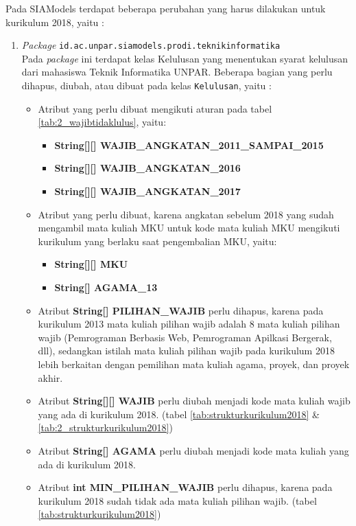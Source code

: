 Pada SIAModels terdapat beberapa perubahan yang harus dilakukan untuk kurikulum 2018, yaitu :
\begin{enumerate}
	\item \textit{Package} \texttt{id.ac.unpar.siamodels.prodi.teknikinformatika}\\
	Pada \textit{package} ini terdapat kelas Kelulusan yang menentukan syarat kelulusan dari mahasiswa Teknik Informatika UNPAR. Beberapa bagian yang perlu dihapus, diubah, atau dibuat pada kelas \texttt{Kelulusan}, yaitu :
	\begin{itemize}
		\item Atribut yang perlu dibuat mengikuti aturan pada tabel \ref{tab:2_wajibtidaklulus}, yaitu:
		\begin{itemize}
			\item \textbf{String[][] WAJIB\_ANGKATAN\_2011\_SAMPAI\_2015}
			\item \textbf{String[][] WAJIB\_ANGKATAN\_2016}
			\item \textbf{String[][] WAJIB\_ANGKATAN\_2017}
		\end{itemize}
		\item Atribut yang perlu dibuat, karena angkatan sebelum 2018 yang sudah mengambil mata kuliah MKU untuk kode mata kuliah MKU mengikuti kurikulum yang berlaku saat pengembalian MKU, yaitu:
		\begin{itemize}
			\item \textbf{String[][] MKU}
			\item \textbf{String[] AGAMA\_13}
		\end{itemize}
		\item Atribut \textbf{String[] PILIHAN\_WAJIB} perlu dihapus, karena pada kurikulum 2013 mata kuliah pilihan wajib adalah 8 mata kuliah pilihan wajib (Pemrograman Berbasis Web, Pemrograman Apilkasi Bergerak, dll), sedangkan istilah mata kuliah pilihan wajib pada kurikulum 2018 lebih berkaitan dengan pemilihan mata kuliah agama, proyek, dan proyek akhir.
		\item Atribut \textbf{String[][] WAJIB} perlu diubah menjadi kode mata kuliah wajib yang ada di kurikulum 2018. (tabel \ref{tab:strukturkurikulum2018} \& \ref{tab:2_strukturkurikulum2018})
		\item Atribut \textbf{String[] AGAMA} perlu diubah menjadi kode mata kuliah yang ada di kurikulum 2018.
		\item Atribut \textbf{int MIN\_PILIHAN\_WAJIB} perlu dihapus, karena pada kurikulum 2018 sudah tidak ada mata kuliah pilihan wajib. (tabel \ref{tab:strukturkurikulum2018})

\end{itemize}
\end{enumerate}
